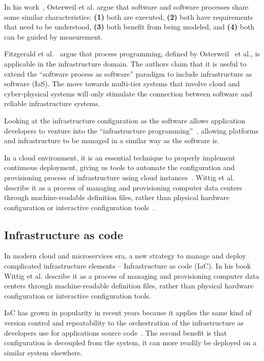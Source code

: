 In his work~\cite{Osterweil}, Osterweil et al. argue that software and software processes share some similar characteristics: \textbf{(1)} both are executed, \textbf{(2)} both have requirements that need to be understood, \textbf{(3)} both benefit from being modeled, and \textbf{(4)} both can be guided by measurement.

Fitzgerald et al.~\cite{Fitzgerald} argue that process programming, defined by Osterweil~\cite{Osterweil} et al., is applicable in the infrastructure domain. The authors claim that it is useful to extend the “software process as software” paradigm to include infrastructure as software (IaS). The move towards multi-tier systems that involve cloud and cyber-physical systems will only stimulate the connection between software and reliable infrastructure systems.

Looking at the infrastructure configuration as the software allows application developers to venture into the “infrastructure programming”~\cite{Fitzgerald}, allowing platforms and infrastructure to be managed in a similar way as the software is.

In a cloud environment, it is an essential technique to properly implement continuous deployment, giving us tools to automate the configuration and provisioning process of infrastructure using cloud instances~\cite{RahmanMW19}. Wittig et al. describe it as a process of managing and provisioning computer data centers through machine-readable definition files, rather than physical hardware configuration or interactive configuration tools~\cite{wittig2018amazon}. 
%
%
\subsection{Infrastructure as code}
%
In modern cloud and microservices era, a new strategy to manage and deploy complicated infrastructure elements -- Infrastructure as code (IaC). In his book~\cite{wittig2018amazon} Wittig et al. describe it as a process of managing and provisioning computer data centers through machine-readable definition files, rather than physical hardware configuration or interactive configuration tools. 

IaC has grown in popularity in recent years because it applies the same kind of version control and repeatability to the orchestration of the infrastructure as developers use for applications source code~\cite{ArtacBNGT17}. The second benefit is that configuration is decoupled from the system, it can more readily be deployed on a similar system elsewhere. 

